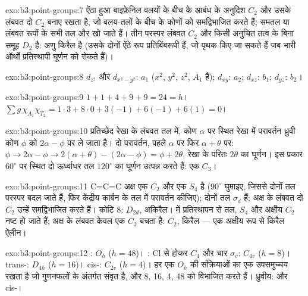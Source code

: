 \begin{solution}{exo:b3:point-groups:7}
ऐंठा हुआ बाइफ़ेनिल वलयों के बीच के आबंध के अनुदिश $C_2$ और उसके लंबवत दो $C_2$
बनाए रखता है, जो वलय-तलों के बीच के कोणों को समद्विभाजित करते हैं; समतल या लंबवत
रूपों के सभी तल और 
खो जाते हैं। तीन परस्पर लंबवत $C_2$ और किसी अनुचित तत्व के बिना समूह
$D_2$ है: अणु किरैल है (उसके दोनों ऐंठे रूप प्रतिबिंबरूपी हैं, जो
पृथक किए जा सकते हैं जब भारी ऑर्थो प्रतिस्थापी घूर्णन को रोकते हैं)।
\end{solution}

\begin{solution}{exo:b3:point-groups:8}
$d_{z^2}$ और $d_{x^2-y^2}$: $a_1$ ($x^2$, $y^2$, $z^2$, $A_1$ हैं); $d_{xy}$: $a_2$; $d_{xz}$:
$b_1$; $d_{yz}$: $b_2$।
\end{solution}

\begin{solution}{exo:b3:point-groups:9}
$1 + 1 + 4 + 9 + 9 = 24 = h$। $\sum g\,\chi_{A_1}\chi_{T_2} = 1\cdot3 + 8\cdot0 + 3(-1)
+ 6(-1) + 6(1) = 0$।
\end{solution}

\begin{solution}{exo:b3:point-groups:10}
प्रतिच्छेद रेखा के लंबवत तल में, कोण
$\alpha$ पर स्थित रेखा में परावर्तन ध्रुवी कोण $\phi$ को $2\alpha - \phi$ पर ले जाता है। दो परावर्तन,
पहले $\alpha$ पर फिर $\alpha + \theta$ पर: $\phi \to 2\alpha - \phi \to 2(\alpha + \theta) - (2\alpha - \phi) =
\phi + 2\theta$, रेखा के परितः $2\theta$ का घूर्णन। इस प्रकार
$60^\circ$ पर स्थित दो ऊर्ध्वाधर तल $120^\circ$ का घूर्णन उत्पन्न करते हैं: एक $C_3$।
\end{solution}

\begin{solution}{exo:b3:point-groups:11}
C=C=C अक्ष एक $C_2$ और एक $S_4$ है ($90^\circ$ घुमाइए, जिससे
दोनों  तल परस्पर बदल जाते हैं, फिर केंद्रीय कार्बन के तल में परावर्तन कीजिए); दोनों
 तल $\sigma_d$ हैं; अक्ष के लंबवत दो $C_2$ उन्हें समद्विभाजित करते हैं।
कोटि 8: $D_{2d}$, अकिरैल।  में प्रतिस्थापन से तल, $S_4$ और अक्षीय
$C_2$ नष्ट हो जाते हैं; अक्ष के लंबवत केवल एक $C_2$
बचता है: $C_2$, किरैल --- एक अक्षीय रूप से किरैल ऐलीन।
\end{solution}

\begin{solution}{exo:b3:point-groups:12}
: $O_h$ ($h = 48$)। : Cl से होकर $C_4$ और चार $\sigma_v$:
$C_{4v}$ ($h = 8$)। trans-: $D_{4h}$ ($h = 16$)। cis-: $C_{2v}$ ($h
= 4$)। हर एक $O_h$ की संक्रियाओं का एक उपसमुच्चय रखता है जो गुणनफलों के अंतर्गत संवृत है,
और 8, 16, 4, 48 को विभाजित करते हैं। ध्रुवीय:  और cis-।
\end{solution}

